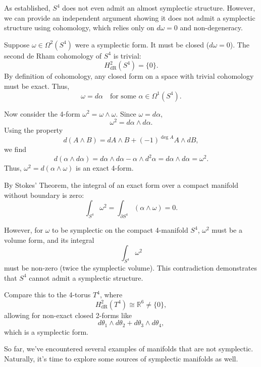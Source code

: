 \begin{example}
As established, $S^4$ does not even admit an almost symplectic structure. However, we can provide an independent argument showing it does not admit a symplectic structure using cohomology, which relies only on $d\omega=0$ and non-degeneracy.

Suppose $\omega \in \Omega^2(S^4)$ were a symplectic form. It must be closed ($d\omega=0$). The second de Rham cohomology of $S^4$ is trivial: 
\[
H^2_{\text{dR}}(S^4) = \{0\}.
\]
By definition of cohomology, any closed form on a space with trivial cohomology must be exact. Thus, 
\[
\omega = d\alpha \quad \text{for some } \alpha \in \Omega^1(S^4).
\]

Now consider the 4-form $\omega^2 = \omega \wedge \omega$. Since $\omega = d\alpha$, 
\[
\omega^2 = d\alpha \wedge d\alpha.
\]
Using the property 
\[
d(A \wedge B) = dA \wedge B + (-1)^{\deg A} A \wedge dB,
\]
we find
\[
d(\alpha \wedge d\alpha) = d\alpha \wedge d\alpha - \alpha \wedge d^2\alpha = d\alpha \wedge d\alpha = \omega^2.
\]
Thus, $\omega^2 = d(\alpha \wedge \omega)$ is an exact 4-form.

By Stokes' Theorem, the integral of an exact form over a compact manifold without boundary is zero:
\[
\int_{S^4} \omega^2 = \int_{\partial S^4} (\alpha \wedge \omega) = 0.
\]

However, for $\omega$ to be symplectic on the compact 4-manifold $S^4$, $\omega^2$ must be a volume form, and its integral 
\[
\int_{S^4} \omega^2
\]
must be non-zero (twice the symplectic volume). This contradiction demonstrates that $S^4$ cannot admit a symplectic structure.

Compare this to the 4-torus $T^4$, where 
\[
H^2_{\text{dR}}(T^4) \cong \mathbb{R}^6 \neq \{0\},
\]
allowing for non-exact closed 2-forms like 
\[
d\theta_1 \wedge d\theta_2 + d\theta_3 \wedge d\theta_4,
\]
which is a symplectic form.
\end{example}

So far, we've encountered several examples of manifolds that are not symplectic. Naturally, it's time to explore some sources of symplectic manifolds as well.

